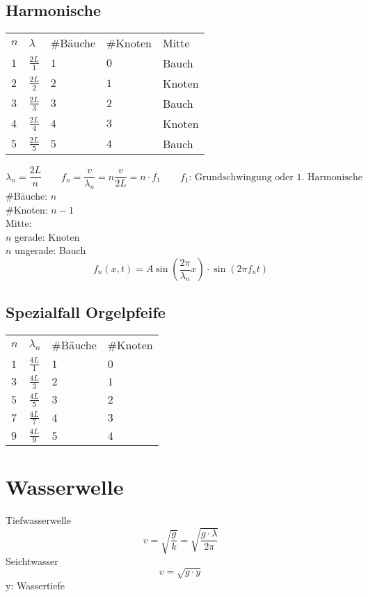 \subsection{Harmonische}
\begin{tabular}{lllll}
\rowcolor{white} $n$ & $\lambda$       & \#Bäuche & \#Knoten & Mitte \\
\rowcolor{lgray} $1$ & $\frac{2 L}{1}$ & $1$      & $0$      & Bauch \\
\rowcolor{white} $2$ & $\frac{2 L}{2}$ & $2$      & $1$      & Knoten \\
\rowcolor{lgray} $3$ & $\frac{2 L}{3}$ & $3$      & $2$      & Bauch \\
\rowcolor{white} $4$ & $\frac{2 L}{4}$ & $4$      & $3$      & Knoten \\
\rowcolor{lgray} $5$ & $\frac{2 L}{5}$ & $5$      & $4$      & Bauch \\
\end{tabular}
\[ \lambda_n = \frac{2 L}{n} \qquad f_n = \frac{v}{\lambda_n} 
= n \frac{v}{2 L} = n \cdot f_1 \qquad \text{$f_1$: Grundschwingung oder 1. Harmonische}\]
\#Bäuche: $n$ \\
\#Knoten: $n - 1$ \\
Mitte: \\
$n$ gerade: Knoten \\
$n$ ungerade: Bauch
\[ f_n(x, t) 
= A \sin\left(\frac{2 \pi}{\lambda_n} x\right) \cdot \sin(2 \pi f_u t) \]

\subsection{Spezialfall Orgelpfeife}
\begin{tabular}{llll}
\rowcolor{white} $n$ & $\lambda_n$     & \#Bäuche & \#Knoten  \\
\rowcolor{lgray} $1$ & $\frac{4 L}{1}$ & $1$      & $0$       \\
\rowcolor{white} $3$ & $\frac{4 L}{3}$ & $2$      & $1$       \\
\rowcolor{lgray} $5$ & $\frac{4 L}{5}$ & $3$      & $2$       \\
\rowcolor{white} $7$ & $\frac{4 L}{7}$ & $4$      & $3$       \\
\rowcolor{lgray} $9$ & $\frac{4 L}{9}$ & $5$      & $4$       \\
\end{tabular}

\section{Wasserwelle}
Tiefwasserwelle
\[ \boxed{v = \sqrt{\frac{g}{k}} = \sqrt{\frac{g \cdot \lambda}{2 \pi}}} \]
Seichtwasser
\[ \boxed{v = \sqrt{g \cdot y}} \]
y: Wassertiefe